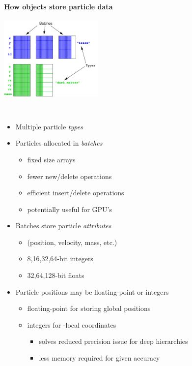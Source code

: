 \begin{frame}[fragile,label=ss-recent-particles] 
  \secframetitle{\ssRecentParticles}
\framesubtitle{How  objects store particle data}
\begin{minipage}{1.8in}
\includegraphics[width=2.0in]{particles-design.pdf} \ \\
\end{minipage} \ 
\begin{minipage}{2.5in}
\begin{itemize}
\item Multiple particle \textit{types}
\item Particles allocated in \textit{batches}
\begin{itemize}
\item fixed size arrays
\item fewer new/delete operations
\item efficient insert/delete operations
\item potentially useful for GPU's
\end{itemize}
\item Batches store particle \textit{attributes}
\begin{itemize}
\item (position, velocity, mass, etc.)
\item 8,16,32,64-bit integers
\item 32,64,128-bit floats
\end{itemize}
\end{itemize}
\end{minipage}
\begin{itemize}
\item Particle positions may be floating-point or integers
\begin{itemize}
\item floating-point for storing global positions
\item integers for -local coordinates
\begin{itemize}
\item solves reduced precision issue for deep hierarchies
\item less memory required for given accuracy
\end{itemize}
\end{itemize}
\end{itemize}
\end{frame}

